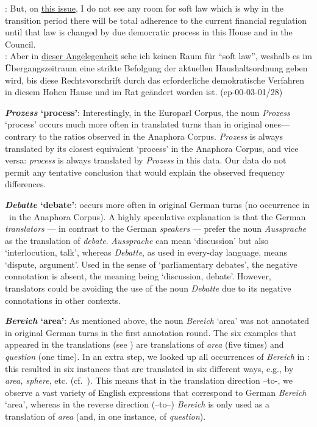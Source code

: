 \documentclass[output=paper]{LSP/langsci}
\begin{document}
\ea 
\label{ex:angelegenheit} %
\ENo: But, on \ul{this issue}, I do not see any room for soft law which is why in the transition period there will be total adherence to the current financial regulation until that law is changed by due democratic process in this House and in the Council.\\
\DEt: Aber in \ul{dieser Angelegenheit} sehe ich keinen Raum f\"ur  ``soft law'', weshalb es im \"Ubergangszeitraum eine strikte Befolgung der aktuellen Haushaltsordnung geben wird, bis diese Rechtsvorschrift durch das erforderliche demokratische Verfahren in diesem Hohen Hause und im Rat ge\"andert worden ist. \hfill{(ep-00-03-01/28)}
\z

{\bfseries {\itshape Prozess} `process'}: Interestingly, in the Europarl Corpus, the noun \textit{Prozess} `process' occurs much more often in translated turns than in original ones---contrary to the ratios observed in the Anaphora Corpus. \textit{Prozess} is always translated by its closest equivalent `process' in the Anaphora Corpus, and vice versa: \textit{process} is always translated by \textit{Prozess} in this data. Our data do not permit any tentative conclusion that would explain the observed frequency differences.

{\bfseries {\itshape Debatte} `debate'}: occurs more often in original German turns (no occurrence in \DEt\ in the Anaphora Corpus). A highly speculative explanation is that the German \emph{translators} --- in contrast to the German \emph{speakers} --- prefer the noun \textit{Aussprache} as the translation of \textit{debate}. \textit{Aussprache} can mean `discussion' but also `interlocution, talk', whereas \textit{Debatte}, as used in every-day language, means `dispute, argument'. Used in the sense of `parliamentary debates', the negative connotation is absent, the meaning being `discussion, debate'. However, translators could be avoiding the use of the noun \textit{Debatte} due to its negative connotations in other contexts.

{\bfseries {\itshape Bereich} `area'}: As mentioned above, the noun \textit{Bereich} `area' was not annotated in original German turns in the first annotation round. The six examples that appeared in the translations (see ) are translations of \textit{area} (five times) and \textit{question} (one time). In an extra step, we looked up all occurrences of \textit{Bereich} in \DEo: this resulted in six instances that are translated in six different ways, e.g., by \textit{area, sphere}, etc. (cf.\ ).%
This means that in the translation direction \DEo--to-\ENt, we observe a vast variety of  English expressions that correspond to German \textit{Bereich} `area', whereas in the reverse direction (\ENo--to--\DEt) \textit{Bereich} is only used as a translation of \textit{area} (and,  in one instance, of \textit{question}).
\end{document}
